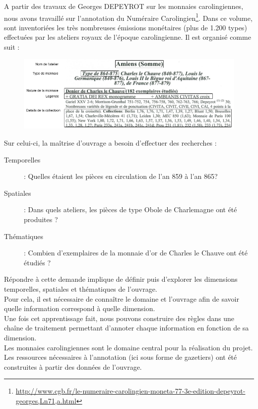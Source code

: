 \documentclass[a4paper, 11pt]{report}
\begin{document}
A partir des travaux de Georges DEPEYROT sur les monnaies carolingiennes, nous avons travaillé sur l'annotation du Numéraire Carolingien\footnote{\url{http://www.cgb.fr/le-numeraire-carolingien-moneta-77-3e-edition-depeyrot-georges,Ln71,a.html}}. Dans ce volume, sont inventoriées les très nombreuses émissions monétaires (plus de 1.200 types) effectuées par les ateliers royaux de l'époque carolingienne. Il est organisé comme suit :
\begin{figure}[H]
\centering
\includegraphics[scale=.5]{img/depeyrotExemple.png}
\end{figure}


Sur celui-ci, la maîtrise d'ouvrage a besoin d'effectuer des recherches :

\begin{description}
\item [Temporelles] : Quelles étaient les pièces en circulation de l'an 859 à l'an 865?
\item [Spatiales] : Dans quels ateliers, les pièces de type Obole de Charlemagne ont été produites ? 
\item [Thématiques] : Combien d'exemplaires de la monnaie d'or de Charles le Chauve ont été étudiés ?
\end{description}

Répondre à cette demande implique de définir puis d'explorer les dimensions temporelles, spatiales et thématiques de l'ouvrage.\\
Pour cela, il est nécessaire de connaître le domaine et l'ouvrage afin de savoir quelle information correspond à quelle dimension.\\
Une fois cet apprentissage fait, nous pouvons construire des règles dans une chaîne de traitement permettant d'annoter chaque information en fonction de sa dimension. \\

Les monnaies carolingiennes sont le domaine central pour la réalisation du projet. Les ressources nécessaires à l'annotation (ici sous forme de gazetiers) ont été construites à partir des données de l'ouvrage.\\
\end{document}
